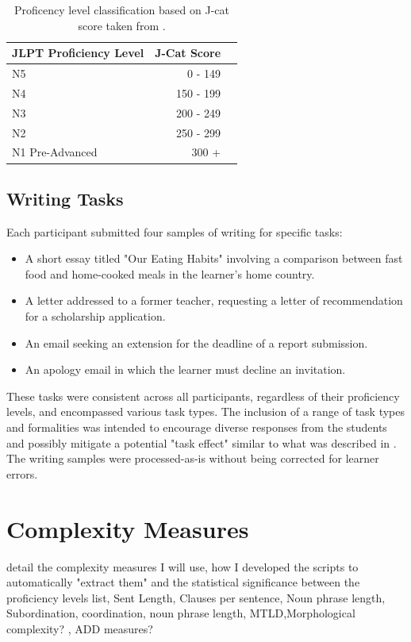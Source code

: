 \begin{table}
\centering
\begin{tabular}{lrl}
\hline \textbf{JLPT Proficiency Level} & \textbf{J-Cat Score}  \\ \hline
N5 & 0 - 149 \\
N4 & 150 - 199 \\
N3 & 200 - 249 \\
N2 & 250 - 299 \\
N1 Pre-Advanced & 300 + \\
\hline
\end{tabular}
\caption[Proficency Levels]{Proficency level classification based on J-cat score taken from \cite{jcat_interpretation_guide}.}
\label{tab:proficency-table}
\end{table}

\subsection{Writing Tasks}

Each participant submitted four samples of writing for specific tasks:
\begin{itemize}
    \item A short essay titled "Our Eating Habits" involving a comparison between fast food and home-cooked meals in the learner's home country.
    \item A letter addressed to a former teacher, requesting a letter of recommendation for a scholarship application.
    \item An email seeking an extension for the deadline of a report submission.
    \item An apology email in which the learner must decline an invitation.
\end{itemize}
These tasks were consistent across all participants, regardless of their proficiency levels, and encompassed various
task types. The inclusion of a range of task types and formalities was intended to encourage diverse responses from
the students and possibly mitigate a potential "task effect" similar to what  was described in \cite{Alexpoulou2017}.
The writing samples were processed-as-is without being corrected for learner errors.


\section{Complexity Measures}
detail the complexity measures I will use, how I developed the scripts to automatically "extract them" and the statistical significance between the proficiency levels
list, Sent Length, Clauses per sentence, Noun phrase length,  Subordination, coordination, noun phrase length, MTLD,Morphological complexity? , ADD measures?

